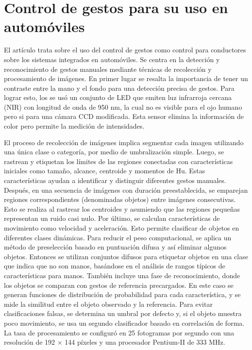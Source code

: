 \section*{Control de gestos para su uso en automóviles}

El artículo trata sobre el uso del control de gestos como control para conductores sobre los sistemas integrados en automóviles. Se centra en la detección y reconocimiento de gestos manuales mediante técnicas de recolección y procesamiento de imágenes. En primer lugar se resalta la importancia de tener un contraste entre la mano y el fondo para una detección precisa de gestos. Para lograr esto, los se usó un conjunto de LED que emiten luz infrarroja cercana (NIR) con longitud de onda de 950 nm, la cual no es visible para el ojo humano pero si para una cámara CCD modificada. Esta sensor elimina la información de color pero permite la medición de intensidades. \cite{CVVEHI}

El proceso de recolección de imágenes implica segmentar cada imagen utilizando una única clase o categoría, por medio de umbralización simple. Luego, se rastrean y etiquetan los límites de las regiones conectadas con características iniciales como tamaño, alcance, centroide y momentos de Hu. Estas características ayudan a identificar y distinguir diferentes gestos manuales. Después, en una secuencia de imágenes con duración preestablecida, se emparejan regiones correspondientes (denominadas objetos) entre imágenes consecutivas. Esto se realiza al rastrear los centroides y asumiendo que las regiones pequeñas representan un ruido casi nulo. Por último, se calculan características de movimiento como velocidad y aceleración. Esto permite clasificar de objetos en diferentes clases dinámicas. Para reducir el peso computacional, se aplica un método de preselección basado en puntuación difusa y así eliminar algunos objetos. Entonces se utilizan conjuntos difusos para etiquetar objetos en una clase que indica que no son manos, basándose en el análisis de rangos típicos de características para manos. También incluye una fase de reconocimiento, donde los objetos se comparan con gestos de referencia precargados. En este caso se generan funciones de distribución de probabilidad para cada característica, y se mide la similitud entre el objeto observado y la referencia. Para evitar clasificaciones falsas, se determina un umbral por defecto y, si el objeto muestra poco movimiento, se usa un segundo clasificador basado en correlación de forma. La tasa de procesamiento se configuró en 25 fotogramas por segundo con una resolución de 192 $\times$ 144 píxeles y una procesador Pentium-II de 333 MHz. \cite{CVVEHI}


